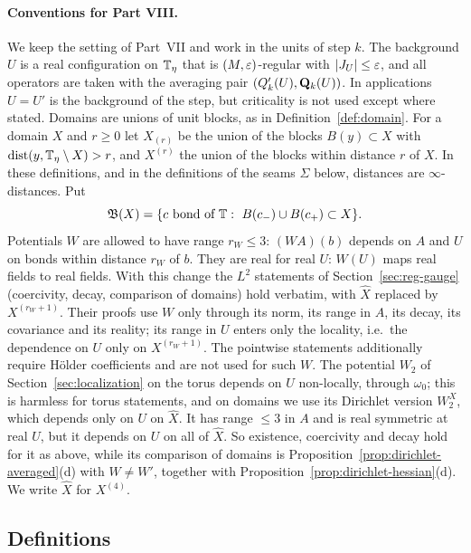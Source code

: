 \paragraph{Conventions for Part VIII.} We keep the setting of Part~VII and work in the units of step $k$. The background $U$ is a real configuration on $\mathbb T_\eta$ that is $(M,\varepsilon)$-regular with $|J_U|\le\varepsilon$, and all operators are taken with the averaging pair $(Q'_k(U),\mathbf Q_k(U))$. In applications $U=U'$ is the background of the step, but criticality is not used except where stated. Domains are unions of unit blocks, as in Definition~\ref{def:domain}. For a domain $X$ and $r\ge0$ let $X_{(r)}$ be the union of the blocks $B(y)\subset X$ with $\operatorname{dist}(y,\mathbb T_\eta\setminus X)>r$, and $X^{(r)}$ the union of the blocks within distance $r$ of $X$. In these definitions, and in the definitions of the seams $\Sigma$ below, distances are $\infty$-distances. Put
\[
\mathfrak B(X)=\{c\text{ bond of }\T:\ B(c_-)\cup B(c_+)\subset X\}.
\]
Potentials $W$ are allowed to have range $r_W\le3$: $(WA)(b)$ depends on $A$ and $U$ on bonds within distance $r_W$ of $b$. They are real for real $U$: $W(U)$ maps real fields to real fields. With this change the $L^2$ statements of Section~\ref{sec:reg-gauge} (coercivity, decay, comparison of domains) hold verbatim, with $\hat X$ replaced by $X^{(r_W+1)}$. Their proofs use $W$ only through its norm, its range in $A$, its decay, its covariance and its reality; its range in $U$ enters only the locality, i.e.\ the dependence on $U$ only on $X^{(r_W+1)}$. The pointwise statements additionally require H\"older coefficients and are not used for such $W$. The potential $W_2$ of Section~\ref{sec:localization} on the torus depends on $U$ non-locally, through $\omega_0$; this is harmless for torus statements, and on domains we use its Dirichlet version $W_2^X$, which depends only on $U$ on $\hat X$. It has range $\le3$ in $A$ and is real symmetric at real $U$, but it depends on $U$ on all of $\hat X$. So existence, coercivity and decay hold for it as above, while its comparison of domains is Proposition~\ref{prop:dirichlet-averaged}(d) with $W\ne W'$, together with Proposition~\ref{prop:dirichlet-hessian}(d). We write $\hat X$ for $X^{(4)}$.

\subsection{Definitions}\label{ss:35.1}

